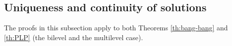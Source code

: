 \documentclass[twocolumn]{autart}    %
\begin{document}
%
%

\subsection{Uniqueness and continuity of solutions}\label{sec: uniqueness continuity}

The proofs in this subsection apply to both Theorems \ref{th:bang-bang} and \ref{th:PLP} (the bilevel and the multilevel case).
\end{document}
